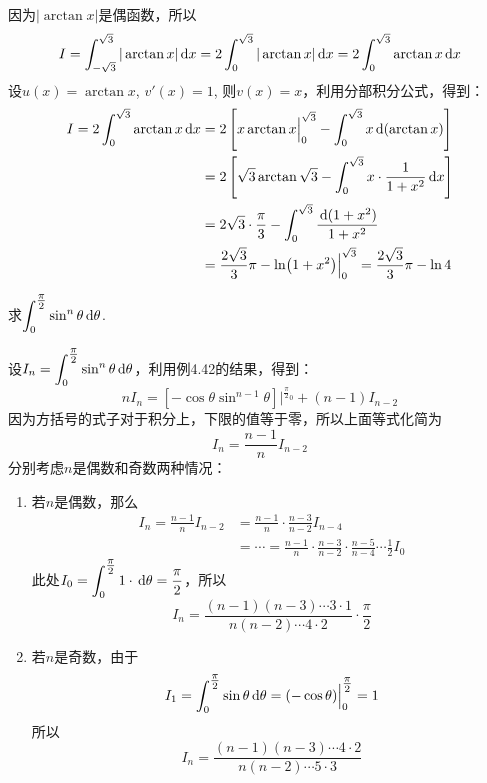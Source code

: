 \begin{solution}
因为$|\arctan x|$是偶函数，所以
\[I=\displaystyle\int^{\sqrt{3}}_{-\sqrt{3}}|\arctan x|\,{\rm d} x=2\displaystyle\int^{\sqrt{3}}_{0}|\arctan x|\,{\rm d} x=2\displaystyle\int^{\sqrt{3}}_{0}\arctan x\,{\rm d} x\]
设$u(x)=\arctan x$, $v'(x)=1$, 则$v(x)=x$，利用分部积分公式，得到：
\[\begin{split}
    I=2\displaystyle\int^{\sqrt{3}}_{0}\arctan x\,{\rm d} x &=2\left[x\arctan x\Big|^{\sqrt{3}}_0-\int^{\sqrt{3}}_0 x\,{\rm d} (\arctan x)\right]\\
    &=2\left[\sqrt{3}\arctan\sqrt{3}-\int^{\sqrt{3}}_0 x\cdot \dfrac{1}{1+x^2}\,{\rm d} x \right]\\
    &=2\sqrt{3}\cdot \dfrac{\pi}{3}-\int^{\sqrt{3}}_0 \dfrac{\,{\rm d}(1+x^2)}{1+x^2}\\
    &=\dfrac{2\sqrt{3}}{3}\pi -\ln(1+x^2)\Big|^{\sqrt{3}}_0= \dfrac{2\sqrt{3}}{3}\pi -\ln 4
\end{split}\]
\end{solution}


\begin{example}
    求$\displaystyle\int^{\tfrac{\pi}{2}}_0 \sin^n \theta\,{\rm d} \theta$.
\end{example}

\begin{solution}
    设$I_n=\displaystyle\int^{\tfrac{\pi}{2}}_0 \sin^n \theta\,{\rm d} \theta$，利用例4.42的结果，得到：
\[nI_n=\left[-\cos\theta\sin^{n-1}\theta\right]\Big|^{\tfrac{\pi}{2}_0} +(n-1)I_{n-2}\]
因为方括号的式子对于积分上，下限的值等于零，所以上面等式化简为
\[I_n=\frac{n-1}{n}I_{n-2}\]
分别考虑$n$是偶数和奇数两种情况：
\begin{enumerate}
    \item 若$n$是偶数，那么
\[\begin{split}
    I_n=\frac{n-1}{n}I_{n-2}&=\frac{n-1}{n}\cdot \frac{n-3}{n-2}I_{n-4}\\
    &=\cdots=\frac{n-1}{n}\cdot \frac{n-3}{n-2}\cdot \frac{n-5}{n-4}\cdots \frac{1}{2}I_{0}
\end{split}
    \]
此处$I_0=\displaystyle\int^{\tfrac{\pi}{2}}_0 1\cdot \,{\rm d} \theta=\dfrac{\pi}{2}$，所以
\[I_n=\frac{(n-1)(n-3)\cdots 3\cdot 1}{n(n-2)\cdots 4\cdot 2}\cdot \frac{\pi}{2}\]

\item 若$n$是奇数，由于
\[I_1=\displaystyle\int^{\tfrac{\pi}{2}}_0 \sin\theta\,{\rm d}\theta =(-\cos\theta)\Big|^{\tfrac{\pi}{2}}_0=1\]
所以
\[I_n=\frac{(n-1)(n-3)\cdots 4\cdot 2}{n(n-2)\cdots 5\cdot 3}\]
\end{enumerate}
\end{solution}

